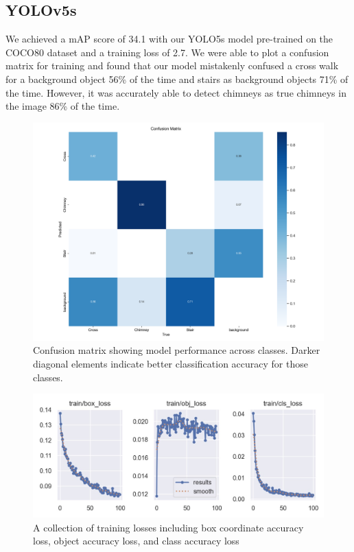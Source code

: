 \documentclass{article}
\begin{document}
\subsection{YOLOv5s}
We achieved a mAP score of 34.1 with our YOLO5s model pre-trained on the COCO80 dataset and a training loss of 2.7. We were able to plot a confusion matrix for training and found that our model mistakenly confused a cross walk for a background object 56\% of the time and stairs as background objects 71\% of the time. However, it was accurately able to detect chimneys as true chimneys in the image 86\% of the time.
\begin{figure}[h!]
  \centering
  \includegraphics[width=\linewidth]{confusion_matrix.png}
  \caption{Confusion matrix showing model performance across classes. Darker diagonal elements indicate better classification accuracy for those classes.}
  \label{fig:confusion_matrix}
\end{figure}
\begin{figure}[h!]
  \centering
  \includegraphics[width=\linewidth]{tl_loss.jpg}
  \caption{A collection of training losses including box coordinate accuracy loss, object accuracy loss, and class accuracy loss}
  \label{fig:training_losses}
\end{figure}
\end{document}
